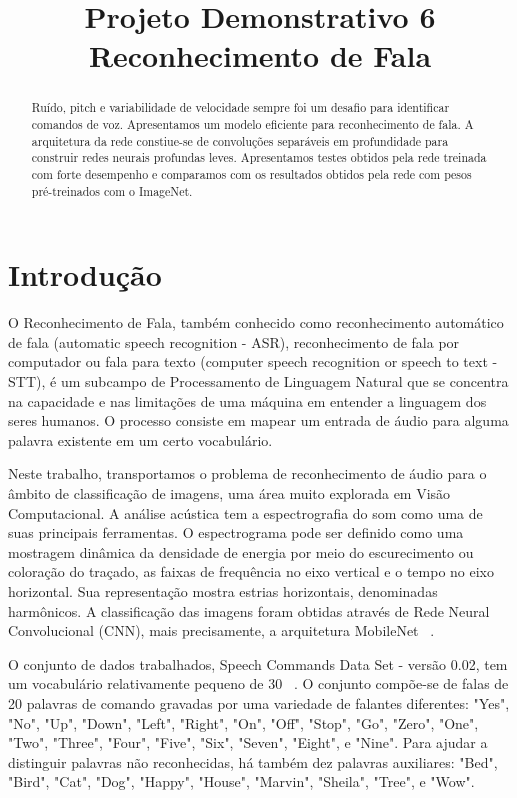 \documentclass{bmvc2k}
\title{Projeto Demonstrativo 6\\ Reconhecimento de Fala}
\begin{document}
\maketitle

\begin{abstract}

Ruído, pitch e variabilidade de velocidade sempre foi um desafio para identificar comandos de voz. Apresentamos um modelo eficiente para reconhecimento de fala. A arquitetura da rede constiue-se de convoluções separáveis em profundidade para construir redes neurais profundas leves. Apresentamos testes obtidos pela rede treinada com forte desempenho e comparamos com os resultados obtidos pela rede com pesos pré-treinados com o ImageNet.

\end{abstract}

\section{Introdução}
\label{sec:intro}

O Reconhecimento de Fala, também conhecido como reconhecimento automático de fala (automatic speech recognition - ASR), reconhecimento de fala por computador ou fala para texto (computer speech recognition or speech to text - STT), é um subcampo de Processamento de Linguagem Natural que se concentra na capacidade e nas limitações de uma máquina em entender a linguagem dos seres humanos. O processo consiste em mapear um entrada de áudio para alguma palavra existente em um certo vocabulário. 

Neste trabalho, transportamos o problema de reconhecimento de áudio para o âmbito de classificação de imagens, uma área muito explorada em Visão Computacional. A análise acústica tem a espectrografia do som como uma de suas principais ferramentas. O espectrograma pode ser definido como uma mostragem dinâmica da densidade de energia por meio do escurecimento ou coloração do traçado, as faixas de frequência no eixo vertical e o tempo no eixo horizontal. Sua representação mostra estrias horizontais, denominadas harmônicos. A classificação das imagens foram obtidas através de Rede Neural Convolucional (CNN), mais precisamente, a arquitetura MobileNet ~\cite{mobilenets}.

O conjunto de dados trabalhados, Speech Commands Data Set - versão 0.02, tem um vocabulário relativamente pequeno de 30 ~\cite{speechcommandsv2}. O conjunto compõe-se de falas de 20 palavras de comando gravadas por uma variedade de falantes diferentes:  "Yes", "No", "Up", "Down", "Left", "Right", "On", "Off", "Stop", "Go", "Zero", "One", "Two", "Three", "Four", "Five", "Six", "Seven", "Eight", e "Nine". Para ajudar a distinguir palavras não reconhecidas, há também dez palavras auxiliares:  "Bed", "Bird", "Cat", "Dog", "Happy", "House", "Marvin", "Sheila", "Tree", e "Wow".
\end{document}

